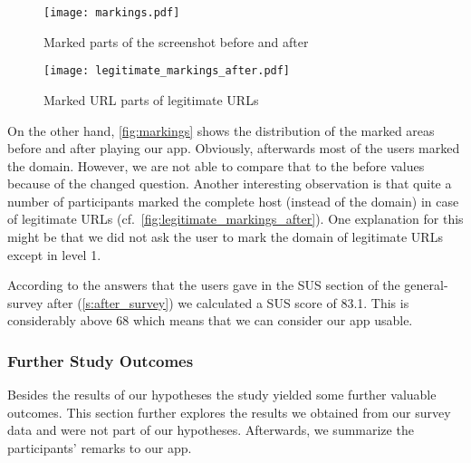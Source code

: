 \begin{description}[leftmargin=0cm]
\begin{figure}
\centering
\texttt{[image: markings.pdf]}
\caption{Marked parts of the screenshot before and after}
\label{fig:markings}
\end{figure}
\begin{figure}
\centering
\texttt{[image: legitimate\_markings\_after.pdf]}
\caption{Marked URL parts of legitimate URLs}
\label{fig:legitimate_markings_after}
\end{figure}
On the other hand, \autoref{fig:markings} shows the distribution of the marked areas before and after playing our app. Obviously, afterwards most of the users marked the domain. However, we are not able to compare that to the before values because of the changed question.
Another interesting observation is that quite a number of participants marked the complete host (instead of the domain) in case of legitimate URLs (cf.~\autoref{fig:legitimate_markings_after}). One explanation for this might be that we did not ask the user to mark the domain of legitimate URLs except in level 1.
\item[Hypothesis 4:]
According to the answers that the users gave in the  SUS section of the general-survey after (\autoref{s:after_survey}) we calculated a SUS score of 83.1. This is considerably above 68 which means that we can consider our app usable.
\end{description}

\subsubsection{Further Study Outcomes}
\label{s:further_exploration}
Besides the results of our hypotheses the study yielded some further valuable outcomes.
This section further explores the results we obtained from our survey data and were not part of our hypotheses.
Afterwards, we summarize the participants' remarks to our app.

